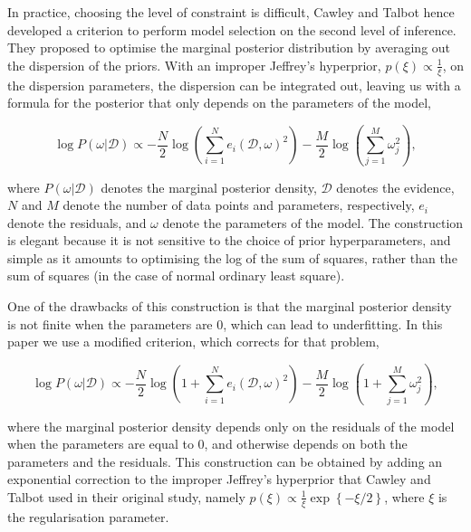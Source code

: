\documentclass[11pt, oneside]{article}
\begin{document}
In practice, choosing the level of constraint is difficult, Cawley and Talbot hence developed a criterion to perform model selection on the second level of inference.
They proposed to optimise the marginal posterior distribution by averaging out the dispersion of the priors.
With an improper Jeffrey's hyperprior, $p(\xi) \propto \frac{1}{\xi}$, on the dispersion parameters, the dispersion can be integrated out, leaving us with a formula for the posterior that only depends on the parameters of the model,

\vspace{-0.5cm}
\begin{equation}
	\log P(\omega | \mathcal{D}) \propto - \frac{N}{2} \log \left(\sum_{i=1}^{N} e_i(\mathcal{D},\omega)^2\right) - \frac{M}{2} \log \left(\sum_{j=1}^{M} \omega_{j}^2 \right),
\end{equation}

where $P(\omega|\mathcal{D})$ denotes the marginal posterior density, $\mathcal{D}$ denotes the evidence, $N$ and $M$ denote the number of data points and parameters, respectively, $e_i$ denote the residuals, and $\omega$ denote the parameters of the model.
The construction is elegant because it is not sensitive to the choice of prior hyperparameters, and simple as it amounts to optimising the log of the sum of squares, rather than the sum of squares (in the case of normal ordinary least square).

One of the drawbacks of this construction is that the marginal posterior density is not finite when the parameters are 0, which can lead to underfitting.
In this paper we use a modified criterion, which corrects for that problem,

\vspace{-0.5cm}
\begin{equation}
	\log P(\omega | \mathcal{D}) \propto - \frac{N}{2} \log \left(1 + \sum_{i=1}^{N} e_i(\mathcal{D},\omega)^2\right) - \frac{M}{2} \log \left(1 + \sum_{j=1}^{M} \omega_{j}^2 \right),
\end{equation}

where the marginal posterior density depends only on the residuals of the model when the parameters are equal to 0, and otherwise depends on both the parameters and the residuals. 
This construction can be obtained by adding an exponential correction to the improper Jeffrey's hyperprior that Cawley and Talbot used in their original study, namely $p(\xi) \propto \frac{1}{\xi} \exp\left\{- \xi/2 \right\}$, where $\xi$ is the regularisation parameter. 
\end{document}

